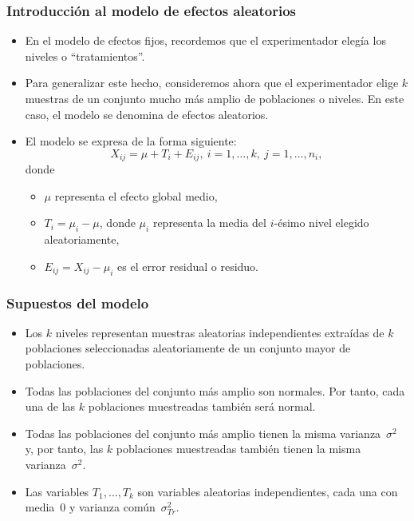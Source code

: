 \begin{frame}
\frametitle{Introducción al modelo de efectos aleatorios}
\begin{itemize}
\item<2-> En el modelo de efectos fijos, recordemos que el experimentador elegía los niveles o ``tratamientos''.
\item<3-> Para generalizar este hecho, consideremos ahora que el experimentador elige $k$ muestras de un conjunto mucho más amplio de poblaciones o niveles. En este caso, el modelo se denomina de efectos aleatorios. 
\item<4-> El modelo se expresa de la forma siguiente:
\[
X_{ij} = \mu + T_i + E_{ij}, \ i=1,\ldots ,k,\ j=1,\ldots,n_i,
\] 
donde
\begin{itemize}
\item<5-> $\mu$ representa el efecto global medio,
\item<6-> $T_i = \mu_i -\mu$, donde $\mu_i$ representa la media del $i$-ésimo nivel elegido aleatoriamente,
\item<7-> $E_{ij}= X_{ij}-\mu_i$ es el error residual o residuo.
\end{itemize}
\end{itemize}
\end{frame}
\begin{frame}
\frametitle{Supuestos del modelo}
\begin{itemize}
\item<2-> Los $k$ niveles representan muestras aleatorias independientes extraídas de $k$ poblaciones seleccionadas aleatoriamente de un conjunto mayor de poblaciones.
\item<3-> Todas las poblaciones del conjunto más amplio son normales. Por tanto, cada una de las $k$ poblaciones muestreadas también será normal.
\item<4-> Todas las poblaciones del conjunto más amplio tienen la misma varianza~$\sigma^2$ y, por tanto, las $k$ poblaciones muestreadas también tienen la misma varianza~$\sigma^2$.
\item<5-> Las variables $T_1,\ldots,T_k$ son variables aleatorias independientes, cada una con media~$0$ y varianza común~$\sigma_{Tr}^2$.
\end{itemize}
\end{frame}
